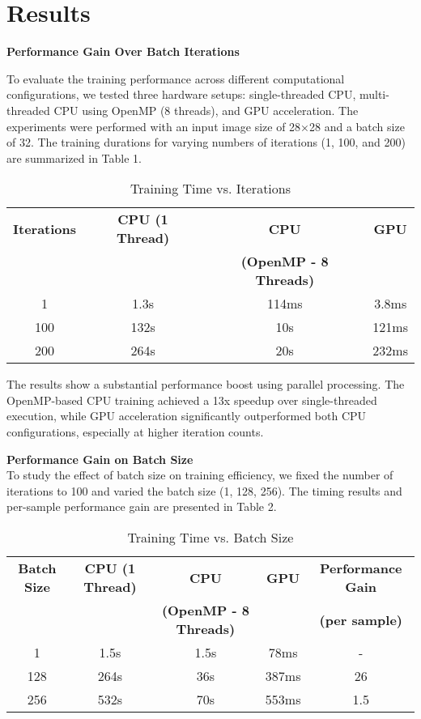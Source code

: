 \section{Results}

\textbf{Performance Gain Over Batch Iterations}

To evaluate the training performance across different computational configurations, we tested three hardware setups: single-threaded CPU, multi-threaded CPU using OpenMP (8 threads), and GPU acceleration. The experiments were performed with an input image size of 28×28 and a batch size of 32. The training durations for varying numbers of iterations (1, 100, and 200) are summarized in Table 1.

\begin{table}[h]
	\centering
	\caption{Training Time vs. Iterations}
	\begin{tabular}{|c|c|c|c|}
		\hline
		\textbf{Iterations} & \textbf{CPU (1 Thread)} & \textbf{CPU} & \textbf{GPU} \\
		\textbf{} & \textbf{} & \textbf{(OpenMP - 8 Threads)} & \textbf{} \\
		\hline
		1   & 1.3s   & 114ms & 3.8ms \\
		\hline
		100 & 132s  & 10s   & 121ms \\
		\hline
		200 & 264s  & 20s   & 232ms \\
		\hline
	\end{tabular}
	\label{tab:iteration-performance}
\end{table}

The results show a substantial performance boost using parallel processing. The OpenMP-based CPU training achieved a 13x speedup over single-threaded execution, while GPU acceleration significantly outperformed both CPU configurations, especially at higher iteration counts.

\textbf{Performance Gain on Batch Size} \\
To study the effect of batch size on training efficiency, we fixed the number of iterations to 100 and varied the batch size (1, 128, 256). The timing results and per-sample performance gain are presented in Table 2.

\begin{table}[h]
	\centering
	\caption{Training Time vs. Batch Size}
	\begin{tabular}{|c|c|c|c|c|}
		\hline
		\textbf{Batch Size} & \textbf{CPU (1 Thread)} & \textbf{CPU} & \textbf{GPU} & \textbf{Performance Gain} \\
		& & \textbf{(OpenMP - 8 Threads)} &  & \textbf{(per sample)} \\
		\hline
		1   & 1.5s  & 1.5s  & 78ms  & - \\
		128 & 264s & 36s   & 387ms & 26 \\
		256 & 532s & 70s   & 553ms & 1.5 \\
		\hline
	\end{tabular}
	\label{tab:batchsize-performance}
\end{table}

